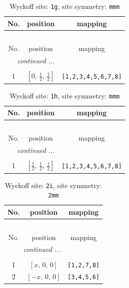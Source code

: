 \documentclass[fleqn,8pt]{jsarticle}
\begin{document}
\renewcommand{\arraystretch}{1.2}
\begin{longtable}{ccc}
\caption{Wyckoff site: {\tt 1g}, site symmetry: {\tt mmm}}
 \\
 \hline \hline
No. & position & mapping \\ \hline \endfirsthead

\multicolumn{2}{l}{\tablename\ \thetable{}} \\
 \hline \hline
No. & position & mapping \\ \hline \endhead

 \hline \hline
\multicolumn{2}{r}{\footnotesize\it continued ...} \\ \endfoot

 \hline \hline
\multicolumn{2}{r}{} \\ \endlastfoot

1 & $\left[ 0,\, \frac{1}{2},\, \frac{1}{2} \right]$ & {\tt [1,2,3,4,5,6,7,8]} \\
\end{longtable}
\renewcommand{\arraystretch}{1.2}
\begin{longtable}{ccc}
\caption{Wyckoff site: {\tt 1h}, site symmetry: {\tt mmm}}
 \\
 \hline \hline
No. & position & mapping \\ \hline \endfirsthead

\multicolumn{2}{l}{\tablename\ \thetable{}} \\
 \hline \hline
No. & position & mapping \\ \hline \endhead

 \hline \hline
\multicolumn{2}{r}{\footnotesize\it continued ...} \\ \endfoot

 \hline \hline
\multicolumn{2}{r}{} \\ \endlastfoot

1 & $\left[ \frac{1}{2},\, \frac{1}{2},\, \frac{1}{2} \right]$ & {\tt [1,2,3,4,5,6,7,8]} \\
\end{longtable}
\renewcommand{\arraystretch}{1.2}
\begin{longtable}{ccc}
\caption{Wyckoff site: {\tt 2i}, site symmetry: {\tt 2mm}}
 \\
 \hline \hline
No. & position & mapping \\ \hline \endfirsthead

\multicolumn{2}{l}{\tablename\ \thetable{}} \\
 \hline \hline
No. & position & mapping \\ \hline \endhead

 \hline \hline
\multicolumn{2}{r}{\footnotesize\it continued ...} \\ \endfoot

 \hline \hline
\multicolumn{2}{r}{} \\ \endlastfoot

1 & $\left[ x,\, 0,\, 0 \right]$ & {\tt [1,2,7,8]} \\ \hline
2 & $\left[ - x,\, 0,\, 0 \right]$ & {\tt [3,4,5,6]} \\
\end{longtable}
\end{document}
